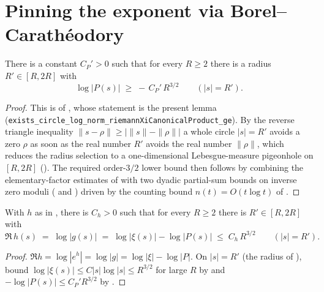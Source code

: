 \section{Pinning the exponent via Borel--Carathéodory}
\label{sec:hf_pin}

\begin{lemma}
\label{lem:hf_minmod}
\leanok
{}
There is a constant $C_P'>0$ such that for every $R\ge2$ there is a radius
$R'\in[R,2R]$ with
\[
  \log|P(s)|\;\ge\;-\,C_P'\,R^{3/2}\qquad(|s|=R').
\]
\end{lemma}

\begin{proof}
\leanok
{}
This is  of , whose statement is the present lemma
(\texttt{exists\_circle\_log\_norm\_riemannXiCanonicalProduct\_ge}).
By the reverse triangle inequality $\|s-\rho\|\ge\bigl|\|s\|-\|\rho\|\bigr|$ a whole circle
$|s|=R'$ avoids a zero $\rho$ as soon as the real number $R'$ avoids the real number
$\|\rho\|$, which reduces the radius selection to a one-dimensional Lebesgue-measure
pigeonhole on $[R,2R]$ (). The required order-$3/2$ lower
bound then follows by combining the elementary-factor estimates of 
with two dyadic partial-sum bounds on inverse zero moduli
( and ) driven by the counting bound
$n(t)=O(t\log t)$ of .
\end{proof}

\begin{lemma}
\label{lem:hf_reH_growth}
\leanok
{}
With $h$ as in , there is $C_h>0$ such that for every $R\ge2$
there is $R'\in[R,2R]$ with
\[
  \Re\,h(s)\;=\;\log|g(s)|\;=\;\log|\xi(s)|-\log|P(s)|\;\le\;C_h\,R^{3/2}
  \qquad(|s|=R').
\]
\end{lemma}

\begin{proof}
\leanok
{}
$\Re h=\log|e^{h}|=\log|g|=\log|\xi|-\log|P|$. On $|s|=R'$ (the radius of
), bound $\log|\xi(s)|\le C|s|\log|s|\le R^{3/2}$ for large $R$
by  and $-\log|P(s)|\le C_P'R^{3/2}$ by .
\end{proof}

